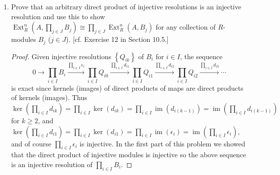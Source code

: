 \documentclass[11pt]{article}
\newcommand{\cbr}[1]{\left\{#1\right\}}
\DeclareMathOperator{\im}{im}
\DeclareMathOperator{\Hom}{Hom}
\DeclareMathOperator{\Ext}{Ext}
\begin{document}
\begin{enumerate}
\begin{enumerate}
\begin{proof}
            By applying the $\Hom_R(-,B)$ and recalling the result of Exercise 10.5.12 we obtain the cochain complex \[0\to \prod_{i\in I}\Hom_R(A_i,B)\to \prod_{i\in I}\Hom_R(P_{i0},B)\to \prod_{i\in I}\Hom_R(P_{i1},B)\to\cdots\] and the cohomology of this sequence yields the $\Ext$ groups. The maps are given by ``direct products'' $d_k$ of the maps which precompose $d_{ik}$ (or $\epsilon_i$); they are given by $d_k(f_i) = (f_i\circ d_{ik})$. The kernel (image) of a direct product of maps is the direct product of kernels (images). Furthermore, the quotient of products is the product of quotients: If modules $B_i\subseteq A_i$ for $i\in I$ then $(\prod A_i)/(\prod B_i)\cong \prod(A_i/B_i)$ by the map taking $(a_i)+\prod B_i$ to $(a_i+B_i)$ (and this map is well defined since $(a_i+b_i)+\prod B_i$ is sent to $(a_i+B_i)$ also), which has a left and right inverse given by the map taking $(a_i + B_i)$ to $(a_i)+\prod B_i$ (which is also well defined for similar reasons).
            
            The first group is \[\Ext_R^0(\oplus_{i\in I}A_i, B) = \ker(d_0) \cong \prod_{i\in I}\ker(d_{i0}) = \prod_{i\in I}\Ext_R^0(A_i,B).\] Similarly, we have \begin{multline*}
                \Ext_R^n(\oplus_{i\in I}A_i, B) = \ker(d_{n+1})/\im(d_n) \cong [\prod_{i\in I}\ker(d_{i(n+1)})]/[\prod_{i\in I}\im(d_{in})] \cong \prod_{i\in I}[\ker(d_{i(n+1)})/\im(d_{in})]\\ = \prod_{i\in I}\Ext_R^n(A_i,B).
            \end{multline*}
        \end{proof}
        \item Prove that an arbitrary direct product of injective resolutions is an injective resolution and use this to show $\Ext_R^n(A,\prod_{j\in J}B_j)\cong \prod_{j\in J}\Ext_R^n(A,B_j)$ for any collection of $R$-modules $B_j$ ($j\in J$). [cf. Exercise 12 in Section 10.5.] \begin{proof}
            Given injective resolutions $\cbr{Q_{ik}}$ of $B_i$ for $i\in I$, the sequence \[0\to \prod_{i\in I} B_i \xrightarrow{\prod_{i\in I}\epsilon_i}\prod_{i\in I}Q_{i0}\xrightarrow{\prod_{i\in I}d_{i1}}\prod_{i\in I}Q_{i1}\xrightarrow{\prod_{i\in I}d_{i2}}\prod_{i\in I}Q_{i2}\xrightarrow{\prod_{i\in I}d_{i3}}\cdots\] is exact since kernels (images) of direct products of maps are direct products of kernels (images). Thus $\ker(\prod_{i\in I}d_{ik}) = \prod_{i\in I}\ker(d_{ik}) = \prod_{i\in I}\im(d_{i(k-1)}) = \im(\prod_{i\in I}d_{i(k-1)})$ for $k\geq 2$, and $\ker(\prod_{i\in I}d_{i1}) = \prod_{i\in I}\ker(d_{i1}) =\prod_{i\in I}\im (\epsilon_i) =\im (\prod_{i\in I}\epsilon_i)$, and of course $\prod_{i\in I}\epsilon_i$ is injective. In the first part of this problem we showed that the direct product of injective modules is injective so the above sequence is an injective resolution of $\prod_{i\in I}B_i$.


\end{proof}
\end{enumerate}
\end{enumerate}
\end{document}
